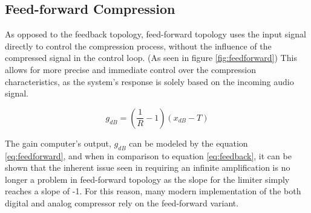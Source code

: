 \documentclass[10pt]{article}
\begin{document}
\begin{multicols*}{2}
\begin{minipage}{\linewidth}
                    \end{minipage}
                
            \subsection{Feed-forward Compression}
                As opposed to the feedback topology, feed-forward topology uses the input signal directly to control the compression process, without the influence of the compressed signal in the control loop. (As seen in figure \ref{fig:feedforward}) This allows for more precise and immediate control over the compression characteristics, as the system's response is solely based on the incoming audio signal.\par

                    \begin{equation}\label{eq:feedforward}
                        g_{dB}=(\frac{1}{R}-1)(x_{dB}-T)
                    \end{equation}
                    
                \noindent The gain computer's output, $g_{dB}$ can be modeled by the equation \ref{eq:feedforward}, and when in comparison to equation \ref{eq:feedback}, it can be shown that the inherent issue seen in requiring an infinite amplification is no longer a problem in feed-forward topology as the slope for the limiter simply reaches a slope of -1. For this reason, many modern implementation of the both digital and analog compressor rely on the feed-forward variant.

                    \noindent
                    \begin{minipage}{\linewidth}

                        \centering

\end{minipage}
\end{multicols*}
\end{document}
